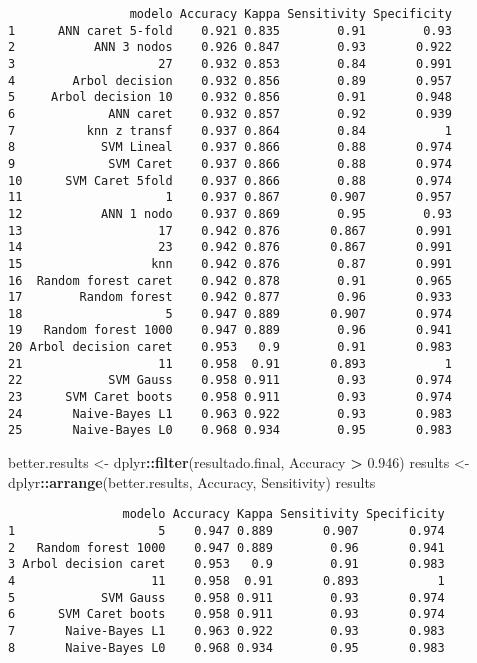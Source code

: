\documentclass[
]{article}
\newenvironment{Shaded}{\begin{snugshade}}{\end{snugshade}}
\newcommand{\FloatTok}[1]{\textcolor[rgb]{0.00,0.00,0.81}{#1}}
\newcommand{\KeywordTok}[1]{\textcolor[rgb]{0.13,0.29,0.53}{\textbf{#1}}}
\newcommand{\NormalTok}[1]{#1}
\newcommand{\OperatorTok}[1]{\textcolor[rgb]{0.81,0.36,0.00}{\textbf{#1}}}
\newcommand{\StringTok}[1]{\textcolor[rgb]{0.31,0.60,0.02}{#1}}
\begin{document}
\begin{verbatim}
                 modelo Accuracy Kappa Sensitivity Specificity
1      ANN caret 5-fold    0.921 0.835        0.91        0.93
2           ANN 3 nodos    0.926 0.847        0.93       0.922
3                    27    0.932 0.853        0.84       0.991
4        Arbol decision    0.932 0.856        0.89       0.957
5     Arbol decision 10    0.932 0.856        0.91       0.948
6             ANN caret    0.932 0.857        0.92       0.939
7          knn z transf    0.937 0.864        0.84           1
8            SVM Lineal    0.937 0.866        0.88       0.974
9             SVM Caret    0.937 0.866        0.88       0.974
10      SVM Caret 5fold    0.937 0.866        0.88       0.974
11                    1    0.937 0.867       0.907       0.957
12           ANN 1 nodo    0.937 0.869        0.95        0.93
13                   17    0.942 0.876       0.867       0.991
14                   23    0.942 0.876       0.867       0.991
15                  knn    0.942 0.876        0.87       0.991
16  Random forest caret    0.942 0.878        0.91       0.965
17        Random forest    0.942 0.877        0.96       0.933
18                    5    0.947 0.889       0.907       0.974
19   Random forest 1000    0.947 0.889        0.96       0.941
20 Arbol decision caret    0.953   0.9        0.91       0.983
21                   11    0.958  0.91       0.893           1
22            SVM Gauss    0.958 0.911        0.93       0.974
23      SVM Caret boots    0.958 0.911        0.93       0.974
24       Naive-Bayes L1    0.963 0.922        0.93       0.983
25       Naive-Bayes L0    0.968 0.934        0.95       0.983
\end{verbatim}

\begin{Shaded}
\begin{Highlighting}[]
\NormalTok{better.results <-}\StringTok{ }\NormalTok{dplyr}\OperatorTok{::}\KeywordTok{filter}\NormalTok{(resultado.final, Accuracy }\OperatorTok{>}\StringTok{ }\FloatTok{0.946}\NormalTok{)}
\NormalTok{results <-}\StringTok{ }\NormalTok{dplyr}\OperatorTok{::}\KeywordTok{arrange}\NormalTok{(better.results, Accuracy, Sensitivity)}
\NormalTok{results}
\end{Highlighting}
\end{Shaded}

\begin{verbatim}
                modelo Accuracy Kappa Sensitivity Specificity
1                    5    0.947 0.889       0.907       0.974
2   Random forest 1000    0.947 0.889        0.96       0.941
3 Arbol decision caret    0.953   0.9        0.91       0.983
4                   11    0.958  0.91       0.893           1
5            SVM Gauss    0.958 0.911        0.93       0.974
6      SVM Caret boots    0.958 0.911        0.93       0.974
7       Naive-Bayes L1    0.963 0.922        0.93       0.983
8       Naive-Bayes L0    0.968 0.934        0.95       0.983
\end{verbatim}
\end{document}
